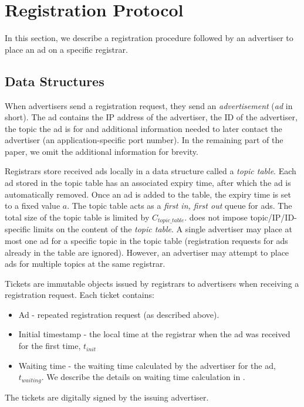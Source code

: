 \section{Registration Protocol}\label{sec:registration}
In this section, we describe a registration procedure followed by an advertiser to place an ad on a specific registrar. 
\subsection{Data Structures}
When advertisers send a registration request, they send an \emph{advertisement} (\emph{ad} in short). The ad contains the IP address of the advertiser, the ID of the advertiser, the topic the ad is for and additional information needed to later contact the advertiser (\eg an application-specific port number). In the remaining part of the paper, we omit the additional information for brevity. 

Registrars store received ads locally in a data structure called a \emph{topic table}. Each ad stored in the topic table has an associated expiry time, after which the ad is automatically removed. Once an ad is added to the table, the expiry time is set to a fixed value $a$. The topic table acts as a \emph{first in, first out} queue for ads. The total size of the topic table is limited by $C_\textit{topic\_table}$. \sysname does not impose topic/IP/ID-specific limits on the content of the \emph{topic table}. 
A single advertiser may place at most one ad for a specific topic in the topic
table (registration requests for ads already in the table are ignored).
However, an advertiser may attempt to place ads for multiple topics at the same registrar.

Tickets are immutable objects issued by registrars to advertisers when receiving a registration request. Each ticket contains:
\begin{itemize}
    \item Ad - repeated registration request (as described above). 
    \item Initial timestamp - the local time at the registrar when the ad was received for the first time, $t_\textit{init}$
    \item Waiting time - the waiting time calculated by the advertiser for the ad, $t_\textit{waiting}$. We describe the details on waiting time calculation in . 
\end{itemize}
The tickets are digitally signed by the issuing advertiser. 


